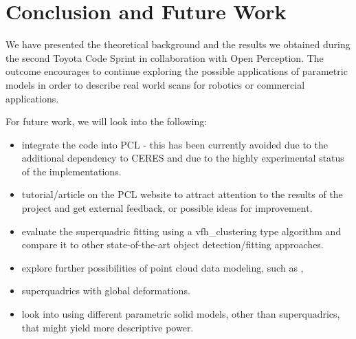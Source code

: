 \documentclass{article}
\begin{document}
\section {Conclusion and Future Work}
\label{sec:conclusion}

We have presented the theoretical background and the results we obtained during the second Toyota Code Sprint in collaboration with Open Perception. The outcome encourages to continue exploring the possible applications of parametric models in order to describe real world scans for robotics or commercial applications.

For future work, we will look into the following:

\begin{itemize}
	\item {integrate the code into PCL - this has been currently avoided due to the additional dependency to CERES and due to the highly experimental status of the implementations.}
	\item {tutorial/article on the PCL website to attract attention to the results of the project and get external feedback, or possible ideas for improvement.}
	\item {evaluate the superquadric fitting using a vfh\_clustering type algorithm and compare it to other state-of-the-art object detection/fitting approaches.}
	\item {explore further possibilities of point cloud data modeling, such as \cite{li_globFit_sigg11}, \cite{Shen:2012:SRP:2366145.2366199}}
	\item {superquadrics with global deformations.}
	\item {look into using different parametric solid models, other than superquadrics, that might yield more descriptive power.}
\end{itemize}


\newpage


\end{document}
